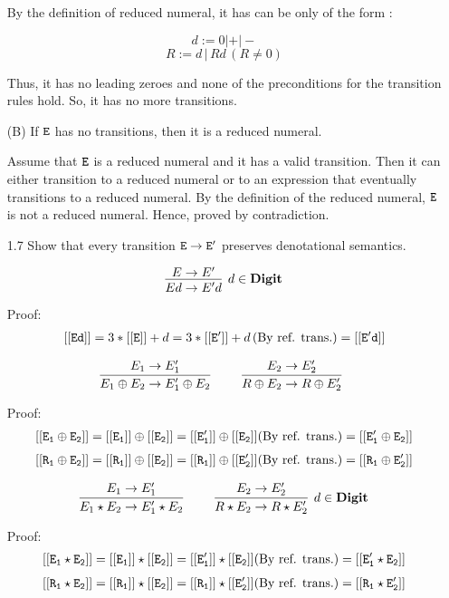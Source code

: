 \documentclass{article}
\begin{document}
\begin{enumerate}
By the definition of reduced numeral, it has can be only of the form :

$$d := 0 | + | -$$
$$R := d \, | \, Rd \, (R \neq 0)$$

Thus, it has no leading zeroes and none of the preconditions for the
transition rules hold. So, it has no more transitions.

(B) If $\mathtt{E}$ has no transitions, then it is a reduced numeral.

Assume that $\mathtt{E}$ is a reduced numeral and it has a valid transition.
Then it can either transition to a reduced numeral or to an expression 
that eventually transitions to a reduced numeral. By the definition of
the reduced numeral, $\mathtt{E}$ is not a reduced numeral. Hence, proved
by contradiction.

\item[1.7] Show that every transition $\mathtt{E} \to \mathtt{E}'$ preserves denotational semantics.

\[
\infer[d \in \Digit]
  {Ed \rightarrow E'd}
  {E \rightarrow E'}
\]

Proof:
\begin{align}
\mathtt{[[{Ed}]]}  
            =  3 * \mathtt{[[{E}]]} + d  
            =  3 * \mathtt{[[{E'}]]} + d \, \text{(By ref. trans.)}  
            = \mathtt{[[{E'd}]]} 
\end{align}

\[
\infer[]
  {E_{1} \oplus E_{2} \rightarrow E_{1}' \oplus E_{2}}
  {E_{1} \rightarrow E_{1}'} \qquad
\infer[]
  {R \oplus E_{2} \rightarrow R \oplus E_{2}'}
  {E_{2} \rightarrow E_{2}'}
\]

Proof:
\begin{align}
\mathtt{[[{E_{1} \oplus E_{2}}]]}  
            =  \mathtt{[[{E_{1}}]]} \oplus \mathtt{[[{E_{2}}]]} 
            =  \mathtt{[[{E_{1}'}]]} \oplus \mathtt{[[{E_{2}}]]}  \text{(By ref. trans.)}  
            = \mathtt{[[{E_{1}' \oplus E_{2}}]]} 
\end{align}
\begin{align}
\mathtt{[[{R_{1} \oplus E_{2}}]]}  
            =  \mathtt{[[{R_{1}}]]} \oplus \mathtt{[[{E_{2}}]]} 
            =  \mathtt{[[{R_{1}}]]} \oplus \mathtt{[[{E_{2}'}]]}  \text{(By ref. trans.)}  
            = \mathtt{[[{R_{1} \oplus E_{2}'}]]} 
\end{align}

\[
\infer[]
  {E_{1} \star E_{2} \rightarrow E_{1}' \star E_{2}}
  {E_{1} \rightarrow E_{1}'} \qquad
\infer[d \in \Digit]
  {R \star E_{2} \rightarrow R \star E_{2}'}
  {E_{2} \rightarrow E_{2}'}
\]

Proof:
\begin{align}
\mathtt{[[{E_{1} \star E_{2}}]]}  
            =  \mathtt{[[{E_{1}}]]} \star \mathtt{[[{E_{2}}]]} 
            =  \mathtt{[[{E_{1}'}]]} \star \mathtt{[[{E_{2}}]]}  \text{(By ref. trans.)}  
            = \mathtt{[[{E_{1}' \star E_{2}}]]} 
\end{align}
\begin{align}
\mathtt{[[{R_{1} \star E_{2}}]]}  
            =  \mathtt{[[{R_{1}}]]} \star \mathtt{[[{E_{2}}]]} 
            =  \mathtt{[[{R_{1}}]]} \star \mathtt{[[{E_{2}'}]]}  \text{(By ref. trans.)}  
            = \mathtt{[[{R_{1} \star E_{2}'}]]} 
\end{align}


\end{enumerate}
\end{document}
